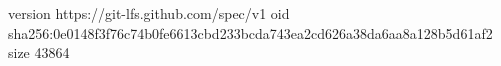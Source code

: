 version https://git-lfs.github.com/spec/v1
oid sha256:0e0148f3f76c74b0fe6613cbd233bcda743ea2cd626a38da6aa8a128b5d61af2
size 43864
